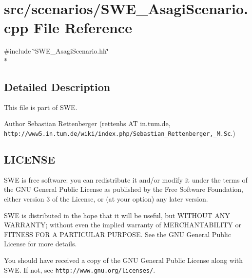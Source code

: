\section{src/scenarios/\-S\-W\-E\-\_\-\-Asagi\-Scenario.cpp File Reference}
\label{SWE__AsagiScenario_8cpp}
{\ttfamily \#include \char`\"{}S\-W\-E\-\_\-\-Asagi\-Scenario.\-hh\char`\"{}}\\*


\subsection{Detailed Description}
This file is part of S\-W\-E.

\begin{DoxyAuthor}{Author}
Sebastian Rettenberger (rettenbs A\-T in.\-tum.\-de, {\tt http\-://www5.\-in.\-tum.\-de/wiki/index.\-php/\-Sebastian\-\_\-\-Rettenberger,\-\_\-\-M.\-Sc}.)
\end{DoxyAuthor}
\subsection{L\-I\-C\-E\-N\-S\-E}\label{Writer_8hh_LICENSE}
S\-W\-E is free software\-: you can redistribute it and/or modify it under the terms of the G\-N\-U General Public License as published by the Free Software Foundation, either version 3 of the License, or (at your option) any later version.

S\-W\-E is distributed in the hope that it will be useful, but W\-I\-T\-H\-O\-U\-T A\-N\-Y W\-A\-R\-R\-A\-N\-T\-Y; without even the implied warranty of M\-E\-R\-C\-H\-A\-N\-T\-A\-B\-I\-L\-I\-T\-Y or F\-I\-T\-N\-E\-S\-S F\-O\-R A P\-A\-R\-T\-I\-C\-U\-L\-A\-R P\-U\-R\-P\-O\-S\-E. See the G\-N\-U General Public License for more details.

You should have received a copy of the G\-N\-U General Public License along with S\-W\-E. If not, see {\tt http\-://www.\-gnu.\-org/licenses/}. 